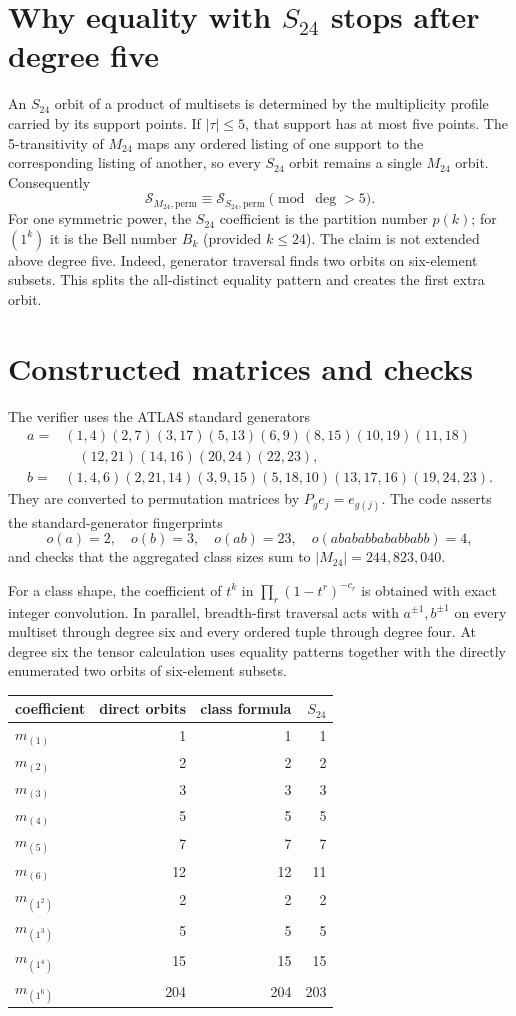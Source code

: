 \documentclass[11pt]{article}
\newcommand{\Sgm}{\mathcal S}
\begin{document}
\section{Why equality with $S_{24}$ stops after degree five}
An $S_{24}$ orbit of a product of multisets is determined by the multiplicity
profile carried by its support points.  If $|\tau|\leq5$, that support has at
most five points.  The 5-transitivity of $M_{24}$ maps any ordered listing of
one support to the corresponding listing of another, so every $S_{24}$ orbit
remains a single $M_{24}$ orbit.  Consequently
\[
\Sgm_{M_{24},\mathrm{perm}}\equiv
\Sgm_{S_{24},\mathrm{perm}}\pmod{\deg>5}.
\]
For one symmetric power, the $S_{24}$ coefficient is the partition number
$p(k)$; for $(1^k)$ it is the Bell number $B_k$ (provided $k\leq24$).
The claim is not extended above degree five.  Indeed, generator traversal
finds two orbits on six-element subsets.  This splits the all-distinct
equality pattern and creates the first extra orbit.

\section{Constructed matrices and checks}
The verifier uses the ATLAS standard generators
\begin{align*}
a={}&(1,4)(2,7)(3,17)(5,13)(6,9)(8,15)(10,19)(11,18)\\
&\quad(12,21)(14,16)(20,24)(22,23),\\
b={}&(1,4,6)(2,21,14)(3,9,15)(5,18,10)(13,17,16)(19,24,23).
\end{align*}
They are converted to permutation matrices by $P_ge_j=e_{g(j)}$.  The code
asserts the standard-generator fingerprints
\[
o(a)=2,\quad o(b)=3,\quad o(ab)=23,\quad
o(abababbababbabb)=4,
\]
and checks that the aggregated class sizes sum to
$|M_{24}|=244{,}823{,}040$.

For a class shape, the coefficient of $t^k$ in
$\prod_r(1-t^r)^{-c_r}$ is obtained with exact integer convolution.  In
parallel, breadth-first traversal acts with $a^{\pm1},b^{\pm1}$ on every
multiset through degree six and every ordered tuple through degree four.  At
degree six the tensor calculation uses equality patterns together with the
directly enumerated two orbits of six-element subsets.

\begin{center}
\begin{tabular}{@{}lrrr@{}}\toprule
coefficient & direct orbits & class formula & $S_{24}$\\\midrule
$m_{(1)}$&1&1&1\\
$m_{(2)}$&2&2&2\\
$m_{(3)}$&3&3&3\\
$m_{(4)}$&5&5&5\\
$m_{(5)}$&7&7&7\\
$m_{(6)}$&12&12&11\\\addlinespace
$m_{(1^2)}$&2&2&2\\
$m_{(1^3)}$&5&5&5\\
$m_{(1^4)}$&15&15&15\\
$m_{(1^6)}$&204&204&203\\\bottomrule
\end{tabular}
\end{center}
\end{document}
